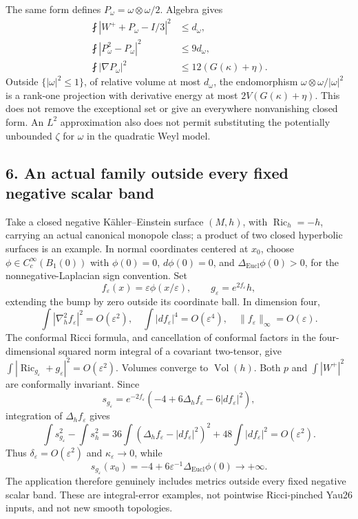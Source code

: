 \documentclass[
  11pt,
]{article}
\begin{document}
The same form defines \(P_\omega=\omega\otimes\omega/2\). Algebra gives
\[
 \begin{aligned}
 \fint|W^++P_\omega-I/3|^2&\le d_\omega,\\
 \fint|P_\omega^2-P_\omega|^2&\le9d_\omega,\\
 \fint|\nabla P_\omega|^2&\le12(G(\kappa)+\eta).
 \end{aligned}
 \tag{16}
\] Outside \(\{|\omega|^2\le1\}\), of relative volume at most
\(d_\omega\), the endomorphism \(\omega\otimes\omega/|\omega|^2\) is a
rank-one projection with derivative energy at most
\(2V(G(\kappa)+\eta)\). This does not remove the exceptional set or give
an everywhere nonvanishing closed form. An \(L^2\) approximation also
does not permit substituting the potentially unbounded \(\zeta\) for
\(\omega\) in the quadratic Weyl model.

\hypertarget{an-actual-family-outside-every-fixed-negative-scalar-band}{%
\subsection{6. An actual family outside every fixed negative scalar
band}\label{an-actual-family-outside-every-fixed-negative-scalar-band}}

Take a closed negative Kähler--Einstein surface \((M,h)\), with
\(\operatorname{Ric}_h=-h\), carrying an actual canonical monopole
class; a product of two closed hyperbolic surfaces is an example. In
normal coordinates centered at \(x_0\), choose
\(\phi\in C_c^\infty(B_1(0))\) with \(\phi(0)=0\), \(d\phi(0)=0\), and
\(\Delta_{\mathrm{Eucl}}\phi(0)>0\), for the nonnegative-Laplacian sign
convention. Set \[
 f_\varepsilon(x)=\varepsilon\phi(x/\varepsilon),\qquad
 g_\varepsilon=e^{2f_\varepsilon}h,
\] extending the bump by zero outside its coordinate ball. In dimension
four, \[
 \int|\nabla_h^2f_\varepsilon|^2=O(\varepsilon^2),\quad
 \int|df_\varepsilon|^4=O(\varepsilon^4),\quad
 \|f_\varepsilon\|_\infty=O(\varepsilon).
\] The conformal Ricci formula, and cancellation of conformal factors in
the four-dimensional squared norm integral of a covariant two-tensor,
give
\(\int|\operatorname{Ric}_{g_\varepsilon}+g_\varepsilon|^2 =O(\varepsilon^2)\).
Volumes converge to \(\operatorname{Vol}(h)\). Both \(p\) and
\(\int|W^+|^2\) are conformally invariant. Since \[
 s_{g_\varepsilon}=e^{-2f_\varepsilon}
       (-4+6\Delta_hf_\varepsilon-6|df_\varepsilon|^2),
\] integration of \(\Delta_h f_\varepsilon\) gives \[
 \int s_{g_\varepsilon}^2-\int s_h^2
 =36\int(\Delta_hf_\varepsilon-|df_\varepsilon|^2)^2
       +48\int|df_\varepsilon|^2=O(\varepsilon^2).
\] Thus \(\delta_\varepsilon=O(\varepsilon^2)\) and
\(\kappa_\varepsilon\to0\), while \[
 s_{g_\varepsilon}(x_0)
 =-4+6\varepsilon^{-1}\Delta_{\mathrm{Eucl}}\phi(0)
 \longrightarrow+\infty.
\] The application therefore genuinely includes metrics outside every
fixed negative scalar band. These are integral-error examples, not
pointwise Ricci-pinched Yau26 inputs, and not new smooth topologies.
\end{document}
